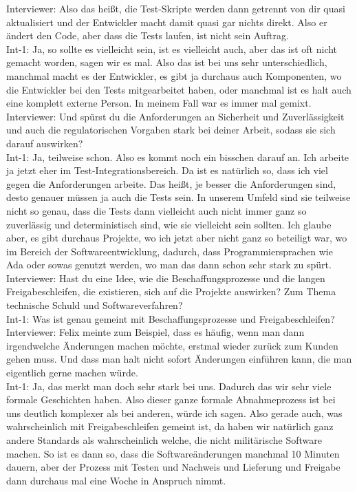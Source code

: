 Interviewer: Also das heißt, die Test-Skripte werden dann getrennt von dir quasi aktualisiert und der Entwickler macht damit quasi gar nichts direkt. Also er ändert den Code, aber dass die Tests laufen, ist nicht sein Auftrag.\\
Int-1: Ja, so sollte es vielleicht sein, ist es vielleicht auch, aber das ist oft nicht gemacht worden, sagen wir es mal. Also das ist bei uns sehr unterschiedlich, manchmal macht es der Entwickler, es gibt ja durchaus auch Komponenten, wo die Entwickler bei den Tests mitgearbeitet haben, oder manchmal ist es halt auch eine komplett externe Person. In meinem Fall war es immer mal gemixt.\\
Interviewer: Und spürst du die Anforderungen an Sicherheit und Zuverlässigkeit und auch die regulatorischen Vorgaben stark bei deiner Arbeit, sodass sie sich darauf auswirken?\\
Int-1: Ja, teilweise schon. Also es kommt noch ein bisschen darauf an. Ich arbeite ja jetzt eher im Test-Integrationsbereich. Da ist es natürlich so, dass ich viel gegen die Anforderungen arbeite. Das heißt, je besser die Anforderungen sind, desto genauer müssen ja auch die Tests sein. In unserem Umfeld sind sie teilweise nicht so genau, dass die Tests dann vielleicht auch nicht immer ganz so zuverlässig und deterministisch sind, wie sie vielleicht sein sollten. Ich glaube aber, es gibt durchaus Projekte, wo ich jetzt aber nicht ganz so beteiligt war, wo im Bereich der Softwareentwicklung, dadurch, dass Programmiersprachen wie Ada oder sowas genutzt werden, wo man das dann schon sehr stark zu spürt.\\
Interviewer: Hast du eine Idee, wie die Beschaffungsprozesse und die langen Freigabeschleifen, die existieren, sich auf die Projekte auswirken? Zum Thema technische Schuld und Softwareverfahren?\\
Int-1: Was ist genau gemeint mit Beschaffungsprozesse und Freigabeschleifen?\\
Interviewer: Felix meinte zum Beispiel, dass es häufig, wenn man dann irgendwelche Änderungen machen möchte, erstmal wieder zurück zum Kunden gehen muss. Und dass man halt nicht sofort Änderungen einführen kann, die man eigentlich gerne machen würde.\\
Int-1: Ja, das merkt man doch sehr stark bei uns. Dadurch das wir sehr viele formale Geschichten haben. Also dieser ganze formale Abnahmeprozess ist bei uns deutlich komplexer als bei anderen, würde ich sagen. Also gerade auch, was wahrscheinlich mit Freigabeschleifen gemeint ist, da haben wir natürlich ganz andere Standards als wahrscheinlich welche, die nicht militärische Software machen. So ist es dann so, dass die Softwareänderungen manchmal 10 Minuten dauern, aber der Prozess mit Testen und Nachweis und Lieferung und Freigabe dann durchaus mal eine Woche in Anspruch nimmt.\\
